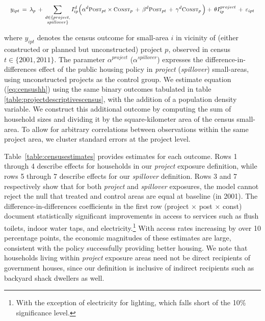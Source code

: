 \documentclass[12pt]{article}
\begin{document}
\vspace{-4mm}

\begin{equation}\label{eq:censushh}
\quad y_{ipt} \, = \, \lambda_{p} \,+\, \sum\limits_{\substack{d\in \{project,\\ spillover\}}} I^d_{ip}\Big( \alpha^d \textsc{\small Post}_{pt}\times\textsc{\small Const}_{p} \, + \, \beta^d\textsc{\small Post}_{pt} \, + \, \gamma^d\textsc{\small Const}_{p} \,\Big) + \, \theta I^{project}_{ip} \, +  \, \varepsilon_{ipt} \quad 
\end{equation}

\noindent where $y_{ipt}$ denotes the census outcome for small-area $i$ in vicinity of (either constructed or planned but unconstructed) project $p$, observed in census $t\in\{2001,2011\}$. The parameter $\alpha^{project}$ ($\alpha^{spillover}$) expresses the difference-in-differences effect of the public housing policy in {\it project} ({\it spillover}) small-areas, using unconstructed projects as the control group. We estimate equation (\ref{eq:censushh}) using the same binary outcomes tabulated in table \ref{table:projectdescriptivescensus}, with the addition of a population density variable. We construct this additional outcome by computing the sum of household sizes  and dividing it by the square-kilometer area of the census small-area. To allow for arbitrary correlations between observations within the same project area, we cluster standard errors at the project level. 

Table~\ref{table:censusestimates} provides estimates for each outcome. Rows 1 through 4 describe effects for households in our {\it project} exposure definition, while rows 5 through 7 describe effects for our {\it spillover} definition. Rows 3 and 7 respectively show that for both {\it project} and {\it spillover} exposures, the model cannot reject the null that treated and control areas are equal at baseline (in 2001). The difference-in-differences coefficients in the first row (project$\,\times\,$post$\,\times\,$const) document statistically significant improvements in access to services such as flush toilets, indoor water taps, and electricity.\footnote{With the exception of electricity for lighting, which falls short of the 10\% significance level. } With access rates increasing by over 10 percentage points, the economic magnitudes of these estimates are large, consistent with the policy successfully providing better housing. We note that households living within {\it project} exposure areas need not be direct recipients of government houses, since our definition is inclusive of indirect recipients such as backyard shack dwellers as well. 
\end{document}
